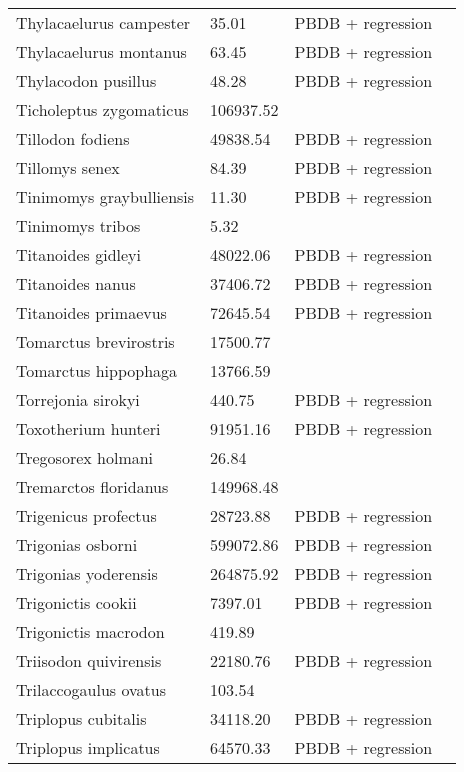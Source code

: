 \documentclass{article}
\begin{document}
\begin{center}
\begin{longtable}{p{} p{} p{} p{}}
    Thylacaelurus campester & 35.01 & PBDB + regression &  \\ 
    Thylacaelurus montanus & 63.45 & PBDB + regression &  \\ 
    Thylacodon pusillus & 48.28 & PBDB + regression &  \\ 
    Ticholeptus zygomaticus & 106937.52 & \cite{Tomiya2013} &  \\ 
    Tillodon fodiens & 49838.54 & PBDB + regression &  \\ 
    Tillomys senex & 84.39 & PBDB + regression &  \\ 
    Tinimomys graybulliensis & 11.30 & PBDB + regression &  \\ 
    Tinimomys tribos & 5.32 & \cite{Skinner1972} &  \\ 
    Titanoides gidleyi & 48022.06 & PBDB + regression &  \\ 
    Titanoides nanus & 37406.72 & PBDB + regression &  \\ 
    Titanoides primaevus & 72645.54 & PBDB + regression &  \\ 
    Tomarctus brevirostris & 17500.77 & \cite{Tomiya2013} &  \\ 
    Tomarctus hippophaga & 13766.59 & \cite{Tomiya2013} &  \\ 
    Torrejonia sirokyi & 440.75 & PBDB + regression &  \\ 
    Toxotherium hunteri & 91951.16 & PBDB + regression &  \\ 
    Tregosorex holmani & 26.84 & \cite{Tomiya2013} &  \\ 
    Tremarctos floridanus & 149968.48 & \cite{Smith2004} &  \\ 
    Trigenicus profectus & 28723.88 & PBDB + regression &  \\ 
    Trigonias osborni & 599072.86 & PBDB + regression &  \\ 
    Trigonias yoderensis & 264875.92 & PBDB + regression &  \\ 
    Trigonictis cookii & 7397.01 & PBDB + regression &  \\ 
    Trigonictis macrodon & 419.89 & \cite{Tomiya2013} &  \\ 
    Triisodon quivirensis & 22180.76 & PBDB + regression &  \\ 
    Trilaccogaulus ovatus & 103.54 & \cite{Tomiya2013} &  \\ 
    Triplopus cubitalis & 34118.20 & PBDB + regression &  \\ 
    Triplopus implicatus & 64570.33 & PBDB + regression &  \\ 

\end{longtable}
\end{center}
\end{document}
